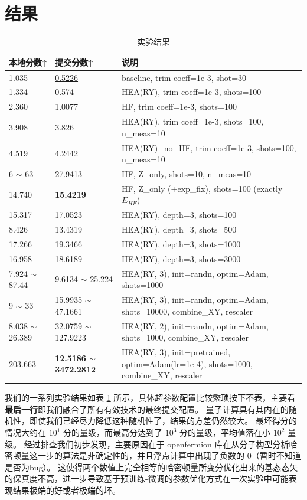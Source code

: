 \documentclass[withoutpreface,bwprint]{cumcmthesis}
\begin{document}
\section{结果}

\begin{table}[h!]
	\centering
	\caption{实验结果}
	\begin{tabular}{lll}
		\textbf{本地分数↑} & \textbf{提交分数↑} & \textbf{说明} \\
		\hline
		1.035 & \underline{0.5226} & baseline, trim coeff=1e-3, shot=30 \\
		1.334 & 0.574  & HEA(RY), trim coeff=1e-3, shots=100 \\
		2.360 & 1.0077 & HF, trim coeff=1e-3, shots=100 \\
		3.908 & 3.826  & HEA(RY), trim coeff=1e-3, shots=100, n\_meas=10 \\
		4.519 & 4.2442 & HEA(RY)\_no\_HF, trim coeff=1e-3, shots=100, n\_meas=10 \\
		6 $ \sim $ 63 & 27.9413 & HF, Z\_only, shots=10, n\_meas=10 \\
		14.740 & \textbf{15.4219} & HF, Z\_only (+exp\_fix), shots=100 (exactly $E_{HF}$) \\
		15.317 & 17.0523 & HEA(RY), depth=3, shots=100 \\
		 8.426 & 13.4319 & HEA(RY), depth=3, shots=500 \\
		17.266 & 19.3466 & HEA(RY), depth=3, shots=1000 \\
		16.958 & 18.6189 & HEA(RY), depth=3, shots=3000 \\
		7.924 $ \sim $ 87.44 & 9.6134 $ \sim $ 25.224 & HEA(RY, 3), init=randn, optim=Adam, shots=1000 \\
		9 $ \sim $ 33 & 15.9935 $ \sim $ 47.1661 & HEA(RY, 3), init=randn, optim=Adam, shots=10000, combine\_XY, rescaler \\
		8.038 $ \sim $ 26.389 & 32.0759 $ \sim $ 127.9223 & HEA(RY, 2), init=randn, optim=Adam, shots=1000, combine\_XY, rescaler \\
		203.663 & \textbf{12.5186 $ \sim $ 3472.2812} & HEA(RY, 3), init=pretrained, optim=Adam(lr=1e-4), shots=1000, combine\_XY, rescaler \\
	\end{tabular}
	\label{tbl:result}
\end{table}

我们的一系列实验结果如表 \ref{tbl:result} 所示，具体超参数配置比较繁琐按下不表，主要看\textbf{最后一行}即我们融合了所有有效技术的最终提交配置。
量子计算具有其内在的随机性，即使我们已经尽力降低这种随机性了，结果的方差仍然较大。
最坏得分的情况大约在 $ 10^1 $ 分的量级，而最高分达到了 $ 10^3 $ 分的量级，平均值落在小 $ 10^2 $ 量级。
经过排查我们初步发现，主要原因在于 openfermion 库在从分子构型分析哈密顿量这一步的算法是非确定性的，并且浮点计算中出现了负数的 0（暂时不知道是否为bug）。
这使得两个数值上完全相等的哈密顿量所变分优化出来的基态态矢的保真度不高，进一步导致基于预训练-微调的参数优化方式在一次实验中可能表现结果极端的好或者极端的坏。
\end{document}
